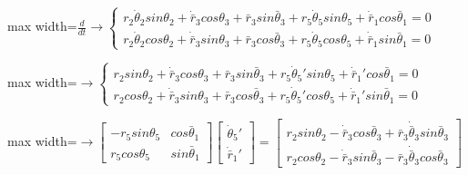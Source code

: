 \documentclass[11pt,a4paper]{article}
\begin{document}
\begin{center}\begin{adjustbox}{max width=\linewidth}$\displaystyle \frac{d}{dt}\rightarrow \left\{ \begin{gathered}{r}_{2}{\dot{\theta }}_{2}sin{\theta }_{2}+{\dot{\bar{r}}}_{3}cos{\theta }_{3}+{\bar{r}}_{3}sin{\bar{\theta }}_{3}+{r}_{5}{\dot{\theta }}_{5}sin{\theta }_{5}+{\dot{\bar{r}}}_{1}cos{\bar{\theta }}_{1}=0\\{r}_{2}{\dot{\theta }}_{2}cos{\theta }_{2}+{\dot{\bar{r}}}_{3}sin{\theta }_{3}+{\bar{r}}_{3}cos{\bar{\theta }}_{3}+{r}_{5}{\dot{\theta }}_{5}cos{\theta }_{5}+{\dot{\bar{r}}}_{1}sin{\bar{\theta }}_{1}=0\end{gathered}\right.$\end{adjustbox}\end{center}

\begin{center}\begin{adjustbox}{max width=\linewidth}$\displaystyle \rightarrow \left\{ \begin{gathered}{r}_{2}sin{\theta }_{2}+{\dot{\bar{r}}}_{3}cos{\theta }_{3}+{\bar{r}}_{3}sin{\bar{\theta }}_{3}+{r}_{5}{\dot{\theta }}_{5}'sin{\theta }_{5}+{\dot{\bar{r}}}_{1}'cos{\bar{\theta }}_{1}=0\\{r}_{2}cos{\theta }_{2}+{\dot{\bar{r}}}_{3}sin{\theta }_{3}+{\bar{r}}_{3}cos{\bar{\theta }}_{3}+{r}_{5}{\dot{\theta }}_{5}'cos{\theta }_{5}+{\dot{\bar{r}}}_{1}'sin{\bar{\theta }}_{1}=0\end{gathered}\right.$\end{adjustbox}\end{center}

\begin{center}\begin{adjustbox}{max width=\linewidth}$\displaystyle \rightarrow \left[ \begin{matrix}-{r}_{5}sin{\theta }_{5} & cos{\bar{\theta }}_{1}\\{r}_{5}cos{\theta }_{5} & sin{\bar{\theta }}_{1}\end{matrix}\right]\left[ \begin{gathered}{\dot{\theta }}_{5}'\\{\dot{\bar{r}}}_{1}'\end{gathered}\right]=\left[ \begin{gathered}{r}_{2}sin{\theta }_{2}-{\dot{\bar{r}}}_{3}cos{\bar{\theta }}_{3}+{\bar{r}}_{3}{\dot{\bar{\theta }}}_{3}sin{\bar{\theta }}_{3}\\{r}_{2}cos{\theta }_{2}-{\dot{\bar{r}}}_{3}sin{\bar{\theta }}_{3}-{\bar{r}}_{3}{\dot{\bar{\theta }}}_{3}cos{\bar{\theta }}_{3}\end{gathered}\right]$\end{adjustbox}\end{center}
\end{document}
